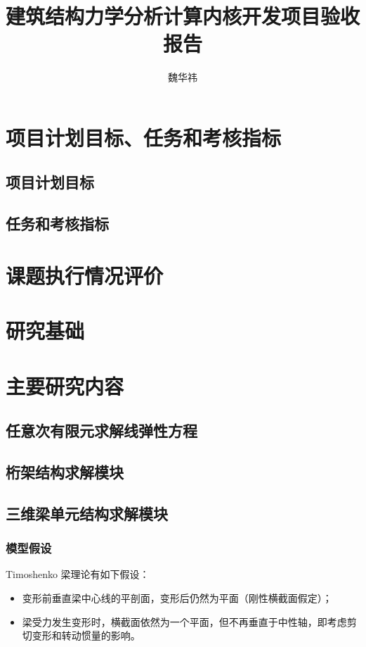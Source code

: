 \documentclass{article}
\begin{document}
\title{建筑结构力学分析计算内核开发项目验收报告}
\author{魏华祎}
\date{\chntoday}
\maketitle

\section{项目计划目标、任务和考核指标}

\subsection{项目计划目标}


\subsection{任务和考核指标}



\section{课题执行情况评价}


\section{研究基础}



\section{主要研究内容}
\subsection{任意次有限元求解线弹性方程}

\subsection{桁架结构求解模块}


\subsection{三维梁单元结构求解模块}

\subsubsection{模型假设}
Timoshenko 梁理论有如下假设：
\begin{itemize}
\item 变形前垂直梁中心线的平剖面，变形后仍然为平面（刚性横截面假定）；

\item 梁受力发生变形时，横截面依然为一个平面，但不再垂直于中性轴，即考虑剪切变形和转动惯量的影响。
\end{itemize}
\end{document}
